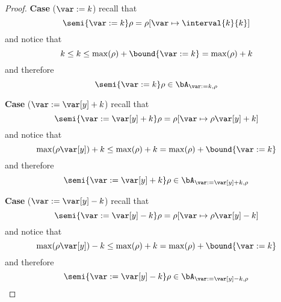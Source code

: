 \begin{proof}
  \medskip

  \noindent
  \textbf{Case} (\(\var := k\))
  recall that
  \begin{equation*}
    \semi{\var := k}\rho = \rho[\var \mapsto \interval{k}{k}]
  \end{equation*}
  and notice that
  \begin{equation*}
    k \leq k \leq \max(\rho) + \bound{\var := k} = \max(\rho) + k
  \end{equation*}
  and therefore
  \begin{equation*}
    \semi{\var:= k}\rho \in \bA_{\var:= k, \rho}
  \end{equation*}
   
  \medskip

  \noindent
  \textbf{Case} (\(\var := \var[y] + k\))
  recall that
  \begin{equation*}
    \semi{\var := \var[y] + k}\rho = \rho[\var \mapsto \rho\var[y] + k]
  \end{equation*}
  and notice that
  \begin{equation*}
    \max(\rho\var[y]) + k \leq \max(\rho) + k = \max(\rho) + \bound{\var := k}
  \end{equation*}
  and therefore
  \begin{equation*}
    \semi{\var:= \var[y] + k}\rho \in \bA_{\var:=\var[y] + k, \rho}
  \end{equation*}

  \medskip

  \noindent
  \textbf{Case} (\(\var := \var[y] - k\))
  recall that
  \begin{equation*}
    \semi{\var := \var[y] - k}\rho = \rho[\var \mapsto \rho\var[y] - k]
  \end{equation*}
  and notice that
  \begin{equation*}
    \max(\rho\var[y]) - k \leq \max(\rho) + k = \max(\rho) + \bound{\var := k}
  \end{equation*}
  and therefore
  \begin{equation*}
    \semi{\var:=\var[y] - k}\rho \in \bA_{\var:= \var[y] - k, \rho}
  \end{equation*}
  
  \medskip


\end{proof}
